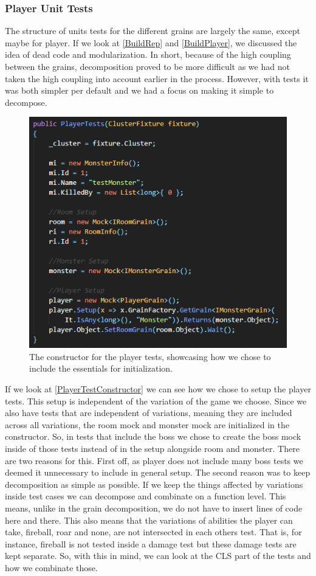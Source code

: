 \subsubsection{Player Unit Tests}
The structure of units tests for the different grains are largely the same, except maybe for player. If we look at \autoref{BuildRep} and \autoref{BuildPlayer}, we discussed the idea of dead code and modularization. In short, because of the high coupling between the grains, decomposition proved to be more difficult as we had not taken the high coupling into account earlier in the process. However, with tests it was both simpler per default and we had a focus on making it simple to decompose. \\
\begin{figure}[h]
    \centering
    \includegraphics[width=0.7\linewidth]{Materials/TestingDiscussion/PlayerTestConstructor}
    \caption{The constructor for the player tests, showcasing how we chose to include the essentials for initialization.}
    \label{PlayerTestConstructor}
\end{figure}
If we look at \autoref{PlayerTestConstructor} we can see how we chose to setup the player tests. This setup is independent of the variation of the game we choose. Since we also have tests that are independent of variations, meaning they are included across all variations, the room mock and monster mock are initialized in the constructor. So, in tests that include the boss we chose to create the boss mock inside of those tests instead of in the setup alongside room and monster. There are two reasons for this. First off, as player does not include many boss tests we deemed it unnecessary to include in general setup. The second reason was to keep decomposition as simple as possible. If we keep the things affected by variations inside test cases we can decompose and combinate on a function level. This means, unlike in the grain decomposition, we do not have to insert lines of code here and there. This also means that the variations of abilities the player can take, fireball, roar and none, are not intersected in each others test. That is, for instance, fireball is not tested inside a damage test but these damage tests are kept separate. So, with this in mind, we can look at the CLS part of the tests and how we combinate those. \\
